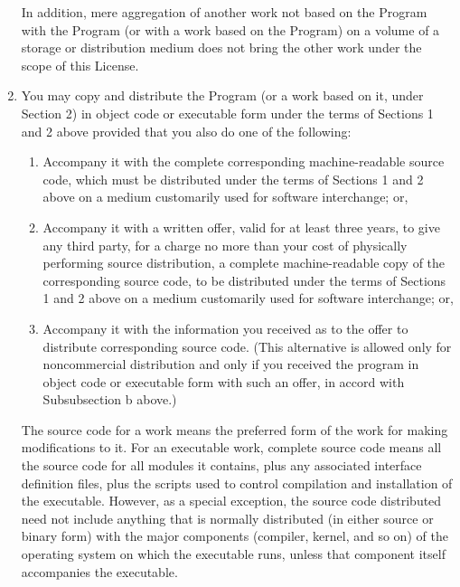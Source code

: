 \begin{enumerate}
  In addition, mere aggregation of another work not based on the Program with the Program (or with a work based on the Program) on a volume of a storage or distribution medium does not bring the other work under the scope of this License.
\item
  You may copy and distribute the Program (or a work based on it, under Section 2) in object code or executable form under the terms of Sections 1 and 2 above provided that you also do one of the following:
  \begin{enumerate}
  \item
    Accompany it with the complete corresponding machine-readable source code, which must be distributed under the terms of Sections 1 and 2 above on a medium customarily used for software interchange; or,
  \item
    Accompany it with a written offer, valid for at least three years, to give any third party, for a charge no more than your cost of physically performing source distribution, a complete machine-readable copy of the corresponding source code, to be distributed under the terms of Sections 1 and 2 above on a medium customarily used for software interchange; or,
  \item
    Accompany it with the information you received as to the offer to distribute corresponding source code. (This alternative is allowed only for noncommercial distribution and only if you received the program in object code or executable form with such an offer, in accord with Subsubsection b above.)
  \end{enumerate}

  The source code for a work means the preferred form of the work for making modifications to it. For an executable work, complete source code means all the source code for all modules it contains, plus any associated interface definition files, plus the scripts used to control compilation and installation of the executable. However, as a special exception, the source code distributed need not include anything that is normally distributed (in either source or binary form) with the major components (compiler, kernel, and so on) of the operating system on which the executable runs, unless that component itself accompanies the executable.


\end{enumerate}
